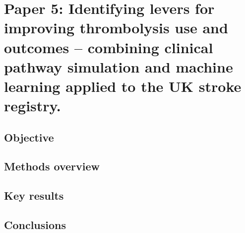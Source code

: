 \section{Paper 5: Identifying levers for improving thrombolysis use and outcomes – combining clinical pathway simulation and machine learning applied to the UK stroke registry.\cite{pearn_identifying_2024}} \label{sec:paper_1}

\subsection{Objective}

\subsection{Methods overview}

\subsection{Key results}


\subsection{Conclusions}
